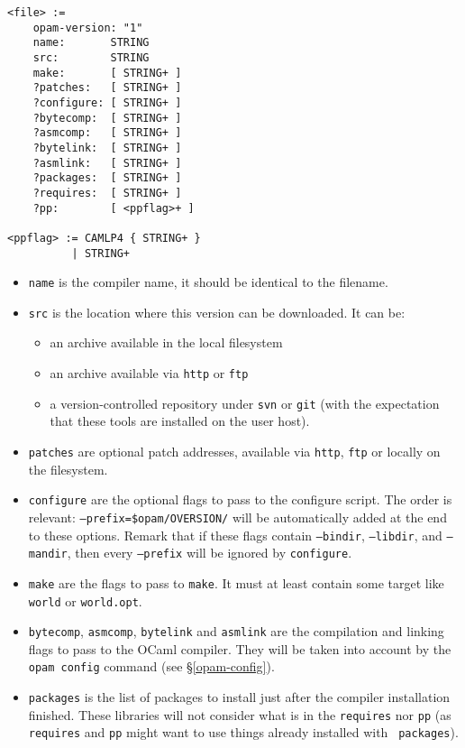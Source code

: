 \documentclass[a4paper,11pt]{article}
\begin{document}
{
\begin{Verbatim}[frame=single]
<file> :=
    opam-version: "1"
    name:       STRING
    src:        STRING
    make:       [ STRING+ ]
    ?patches:   [ STRING+ ]
    ?configure: [ STRING+ ]
    ?bytecomp:  [ STRING+ ]
    ?asmcomp:   [ STRING+ ]
    ?bytelink:  [ STRING+ ]
    ?asmlink:   [ STRING+ ]
    ?packages:  [ STRING+ ]
    ?requires:  [ STRING+ ]
    ?pp:        [ <ppflag>+ ]

<ppflag> := CAMLP4 { STRING+ }
          | STRING+
\end{Verbatim}
}
\begin{itemize}

\item {\tt name} is the compiler name, it should be identical to the filename.
\item {\tt src} is the location where this version can be downloaded. It can be:
\begin{itemize}
\item an archive available in the local filesystem
\item an archive available via {\tt http} or {\tt ftp}
\item a version-controlled repository under {\tt svn} or {\tt git}
  (with the expectation that these tools are installed on the user host).
\end{itemize}

\item {\tt patches} are optional patch addresses, available via {\tt http}, {\tt ftp}
  or locally on the filesystem.

\item {\tt configure} are the optional flags to pass to the configure
  script. The order is relevant: {\tt --prefix=\$opam/OVERSION/} will be automatically 
  added at the end to these options.
  Remark that if these flags contain {\tt --bindir}, {\tt --libdir}, 
  and {\tt --mandir}, then every {\tt --prefix} will be ignored by {\tt configure}.

\item {\tt make} are the flags to pass to {\tt make}. 
  It must at least contain some target like {\tt world} or {\tt world.opt}.

\item {\tt bytecomp}, {\tt asmcomp}, {\tt bytelink} and {\tt asmlink}
  are the compilation and linking flags to pass to the OCaml
  compiler. They will be taken into account by the \verb+opam config+
  command (see \S\ref{opam-config}).

\item {\tt packages} is the list of packages to install just after the
  compiler installation finished. These libraries will not consider
  what is in the {\tt requires} nor {\tt pp} (as {\tt requires} and
  {\tt pp} might want to use things already installed with {\tt
    packages}).


\end{itemize}
\end{document}
